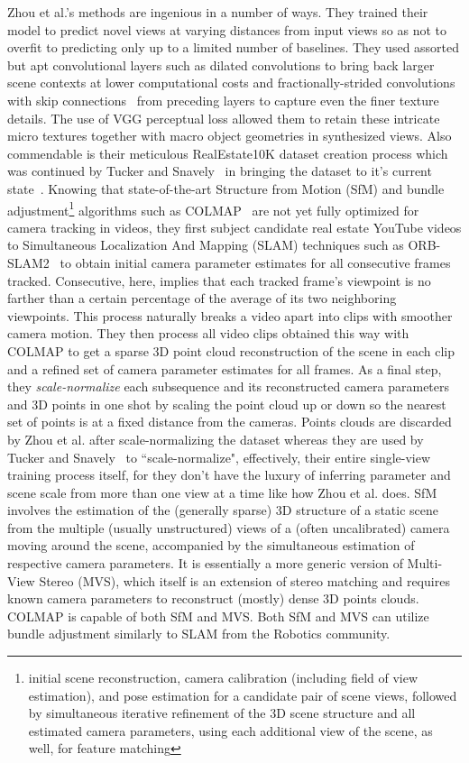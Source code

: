 Zhou et al.'s methods are ingenious in a number of ways. They trained their model to predict novel views at varying distances from input views so as not to overfit to predicting only up to a limited number of baselines. They used assorted but apt convolutional layers such as dilated convolutions to bring back larger scene contexts at lower computational costs and fractionally-strided convolutions~\cite{prove_introduction_2018} with skip connections~\cite{adaloglou_intuitive_2020} from preceding layers to capture even the finer texture details. The use of VGG perceptual loss allowed them to retain these intricate micro textures together with macro object geometries in synthesized views. Also commendable is their meticulous RealEstate10K dataset creation process which was continued by Tucker and Snavely~\cite{single_view_mpi} in bringing the dataset to it's current state~\cite{zhou2018stereo}. Knowing that state-of-the-art Structure from Motion (SfM) and bundle adjustment\footnote{initial scene reconstruction, camera calibration (including field of view estimation), and pose estimation for a candidate pair of scene views, followed by simultaneous iterative refinement of the 3D scene structure and all estimated camera parameters, using each additional view of the scene, as well, for feature matching} algorithms such as COLMAP~\cite{schoenberger2016sfm,schoenberger2016mvs} are not yet fully optimized for camera tracking in videos, they first subject candidate real estate YouTube videos to Simultaneous Localization And Mapping (SLAM) techniques such as ORB-SLAM2~\cite{mur-artal_orb-slam_2015} to obtain initial camera parameter estimates for all consecutive frames tracked. Consecutive, here, implies that each tracked frame's viewpoint is no farther than a certain percentage of the average of its two neighboring viewpoints. This process naturally breaks a video apart into clips with smoother camera motion. They then process all video clips obtained this way with COLMAP to get a sparse 3D point cloud reconstruction of the scene in each clip and a refined set of camera parameter estimates for all frames. As a final step, they \textit{scale-normalize} each subsequence and its reconstructed camera parameters and 3D points in one shot by scaling the point cloud up or down so the nearest set of points is at a fixed distance from the cameras. Points clouds are discarded by Zhou et al. after scale-normalizing the dataset whereas they are used by Tucker and Snavely~\cite{single_view_mpi} to ``scale-normalize", effectively, their entire single-view training process itself, for they don't have the luxury of inferring parameter and scene scale from more than one view at a time like how Zhou et al. does. SfM involves the estimation of the (generally sparse) 3D structure of a static scene from the multiple (usually unstructured) views of a (often uncalibrated) camera moving around the scene, accompanied by the simultaneous estimation of respective camera parameters. It is essentially a more generic version of Multi-View Stereo (MVS), which itself is an extension of stereo matching and requires known camera parameters to reconstruct (mostly) dense 3D points clouds. COLMAP is capable of both SfM and MVS. Both SfM and MVS can utilize bundle adjustment similarly to SLAM from the Robotics community. 